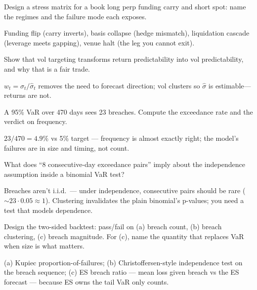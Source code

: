 \begin{exercise}[hard]
Design a stress matrix for a book long perp funding carry and short spot: name the
regimes and the failure mode each exposes.
\end{exercise}
\begin{solution}
Funding flip (carry inverts), basis collapse (hedge mismatch), liquidation cascade
(leverage meets gapping), venue halt (the leg you cannot exit).
\end{solution}

\begin{exercise}[hard]
Show that vol targeting transforms return predictability into vol predictability, and
why that is a fair trade.
\end{exercise}
\begin{solution}
$w_t=\sigma_t/\hat\sigma_t$ removes the need to forecast direction; vol clusters so
$\hat\sigma$ is estimable---returns are not.
\end{solution}

\begin{exercise}[easy]
A 95\% VaR over 470 days sees 23 breaches. Compute the
exceedance rate and the verdict on frequency.
\end{exercise}
\begin{solution}
$23/470 = 4.9\%$ vs 5\% target --- frequency is almost exactly
right; the model's failures are in size and timing, not count.
\end{solution}
\begin{exercise}[medium]
What does ``8 consecutive-day exceedance pairs'' imply about the
independence assumption inside a binomial VaR test?
\end{exercise}
\begin{solution}
Breaches aren't i.i.d.\ --- under independence, consecutive
pairs should be rare ($\sim23\cdot0.05\approx1$). Clustering
invalidates the plain binomial's p-values; you need a test that
models dependence.
\end{solution}
\begin{exercise}[hard]
Design the two-sided backtest: pass/fail on (a) breach count,
(b) breach clustering, (c) breach magnitude. For (c), name the
quantity that replaces VaR when size is what matters.
\end{exercise}
\begin{solution}
(a) Kupiec proportion-of-failures; (b) Christoffersen-style
independence test on the breach sequence; (c) ES breach ratio ---
mean loss given breach vs the ES forecast --- because ES owns the
tail VaR only counts.
\end{solution}

